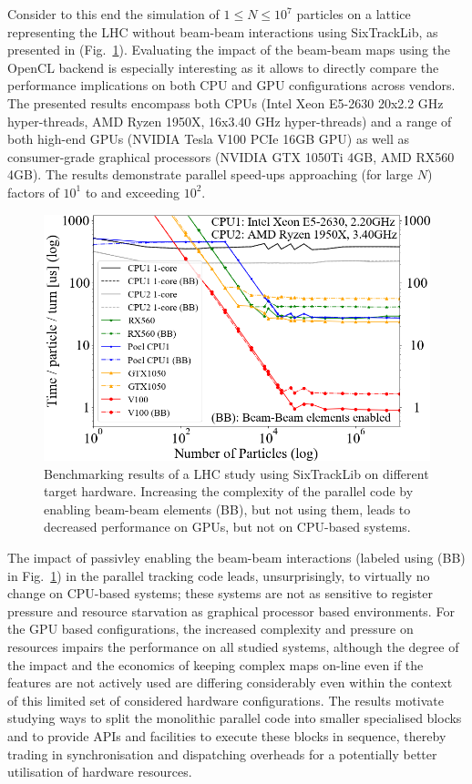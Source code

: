 \documentclass{ws-ijmpa}
\begin{document}
Consider to this end the simulation of $1 \leq N \leq 10^7$ particles on a lattice representing the LHC without beam-beam interactions using SixTrackLib, as presented in (Fig.~\ref{fig:sixtracklib_results}). 
Evaluating the impact of the beam-beam maps using the OpenCL backend is especially interesting as it allows to directly compare the performance implications on both CPU and GPU configurations across vendors. 
The presented results encompass both CPUs (Intel Xeon E5-2630 20x2.2 GHz hyper-threads, AMD Ryzen 1950X, 16x3.40 GHz hyper-threads) and a range of both high-end GPUs (NVIDIA Tesla V100 PCIe 16GB GPU) as well as 
consumer-grade graphical processors (NVIDIA GTX 1050Ti 4GB, AMD RX560 4GB). The results demonstrate parallel speed-ups approaching (for large $N$) factors of $10^1$ to and exceeding $10^2$. 
\begin{figure}[htb]
 \centering
 \includegraphics[width=\columnwidth]{devices_times_per_particle_and_turn.png}
 \caption{Benchmarking results of a LHC study using SixTrackLib on different target hardware. Increasing the complexity of the parallel code by enabling beam-beam elements (BB), but not using them, leads to decreased performance on GPUs, but not on CPU-based systems.}
 \label{fig:sixtracklib_results}
\end{figure}

The impact of passivley enabling the beam-beam interactions (labeled using (BB) in Fig.~\ref{fig:sixtracklib_results}) in the parallel tracking code leads, unsurprisingly, to virtually no change on CPU-based systems; these systems are not as sensitive to register pressure and resource starvation as graphical processor based environments. 
For the GPU based configurations, the increased complexity and pressure on resources impairs the performance on all studied systems, although the degree of the impact and the economics of keeping complex maps on-line even if the features are not actively used
are differing considerably even within the context of this limited set of considered hardware configurations. The results motivate studying ways to split the monolithic parallel code into smaller specialised blocks and to provide APIs and facilities to execute these blocks in sequence, thereby trading in synchronisation and dispatching overheads for a potentially better utilisation of hardware resources.
\end{document}
